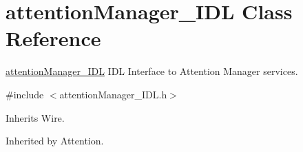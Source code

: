 \section{attention\+Manager\+\_\+\+I\+DL Class Reference}
\label{classattentionManager__IDL}


\hyperlink{classattentionManager__IDL}{attention\+Manager\+\_\+\+I\+DL} I\+DL Interface to Attention Manager services.  




{\ttfamily \#include $<$attention\+Manager\+\_\+\+I\+D\+L.\+h$>$}



Inherits Wire.



Inherited by Attention.

